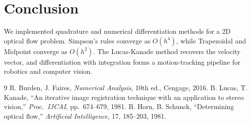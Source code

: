 \documentclass[letterpaper,twocolumn,fleqn]{article}
\begin{document}
\section{Conclusion}

We implemented quadrature and numerical differentiation methods for a 2D optical flow problem. Simpson's rules converge as $O(h^4)$, while Trapezoidal and Midpoint converge as $O(h^2)$. The Lucas-Kanade method recovers the velocity vector, and differentiation with integration forms a motion-tracking pipeline for robotics and computer vision.

\small
\begin{thebibliography}{9}
R. Burden, J. Faires, \emph{Numerical Analysis}, 10th ed.,
  Cengage, 2016.
B. Lucas, T. Kanade, ``An iterative image registration
  technique with an application to stereo vision,'' \emph{Proc.\ IJCAI},
  pp.\ 674--679, 1981.
B. Horn, B. Schunck, ``Determining optical flow,''
  \emph{Artificial Intelligence}, 17, 185--203, 1981.
\end{thebibliography}
\end{document}
